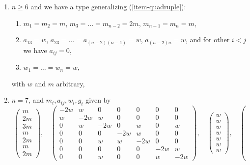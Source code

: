\begin{lemma}
\begin{enumerate}
\begin{enumerate}
\item $m_1 = \ldots = m_{n - 3} = 2m$, $m_{n - 1} = m_n = m$,
\item $a_{12} = \ldots = a_{(n - 2) (n - 1)} = 2w$,
$a_{(n - 2) n} = 2w$, and for other $i < j$ we have $a_{ij} = 0$,
\item $w_1 = w$, $w_2 = \ldots = w_n = 2w$
\end{enumerate}
with $w$ and $m$ arbitrary,
\item
\label{models-item-double-triple}
$n \geq 6$ and we have a type generalizing (\ref{item-quadruple}):
\begin{enumerate}
\item $m_1 = m_2 = m$, $m_3 = \ldots = m_{n - 2} = 2m$, $m_{n - 1} = m_n = m$,
\item $a_{13} = w$, $a_{23} = \ldots = a_{(n - 2) (n - 1)} = w$,
$a_{(n - 2) n} = w$, and for other $i < j$ we have $a_{ij} = 0$,
\item $w_1 = \ldots = w_n = w$,
\end{enumerate}
with $w$ and $m$ arbitrary,
\item
\label{models-item-E6-completed}
$n = 7$, and $m_i, a_{ij}, w_i, g_i$ given by
$$
\left(
\begin{matrix}
m \\
2m \\
3m \\
m \\
2m \\
m \\
2m
\end{matrix}
\right),
\quad
\left(
\begin{matrix}
-2w & w & 0 & 0 & 0 & 0 & 0 \\
w & -2w & w & 0 & 0 & 0 & 0 \\
0 & w & -2w & 0 & w & 0 & w \\
0 & 0 & 0 & -2w & w & 0 & 0 \\
0 & 0 & w & w & -2w & 0 & 0 \\
0 & 0 & 0 & 0 & 0 & -2w & w \\
0 & 0 & w & 0 & 0 & w & -2w
\end{matrix}
\right),
\quad
\left(
\begin{matrix}
w \\
w \\
w \\
w \\
w \\
w \\
w
\end{matrix}
\right),
\quad
\left(
$$
\end{enumerate}
\end{lemma}
